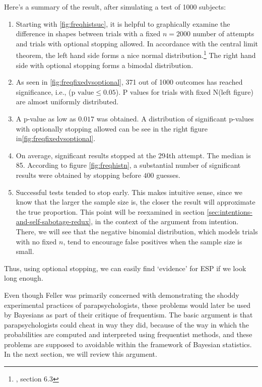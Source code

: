 Here's a summary of the result, after simulating a test of 1000 subjects:

\begin{enumerate}
\def\labelenumi{\arabic{enumi}.}
\tightlist
\item
  Starting with \ref{fig:freqhistsuc}, it is helpful to graphically examine the difference in shapes between trials with a fixed $n=2000$  number of attempts and trials with optional stopping allowed. In accordance with the central limit theorem, the left hand side forms a nice normal distribution.\footnote{\cite{degroot}, section 6.3} The right hand side with optional stopping forms a bimodal distribution.
  
  \item As seen in \ref{fig:freqfixedvsoptional}, 371 out of 1000 outcomes has reached significance, i.e., (\(\text{p value}\leq0.05\)). P values for trials with fixed N(left figure) are almost uniformly distributed.
\item
  A p-value as low as \(0.017\) was obtained. A distribution of significant p-values with optionally stopping allowed can be see in the right figure in\ref{fig:freqfixedvsoptional}. 
\item
  On average, significant results stopped at the 294th attempt. The
  median is 85. According to figure  \ref{fig:freqhistn}, a substantial number of significant results were obtained by stopping before $400$ guesses. 
\item Successful tests tended to stop early. This makes intuitive sense, since we know that the larger the sample size is, the closer the result will approximate the true proportion. This point will be reexamined in section \ref{sec:intentions-and-self-sabotage-redux}, in the context of the argument from intention. There, we will see that the negative binomial distribution, which models trials with no fixed $n$, tend to encourage false positives when the sample size is small. \end{enumerate}



Thus, using optional stopping, we can easily find `evidence' for ESP if
we look long enough.

Even though Feller was primarily concerned with demonstrating the shoddy experimental
practices of parapsychologists, these problems would later be used by Bayesians as part of their critique of frequentism. The basic argument is that
parapsychologists could cheat in way they did, because of the way in
which the probabilities are computed and interpreted using frequentist methods, and these problems
are supposed to avoidable within the framework of Bayesian statistics.
In the next section, we will review this argument.

